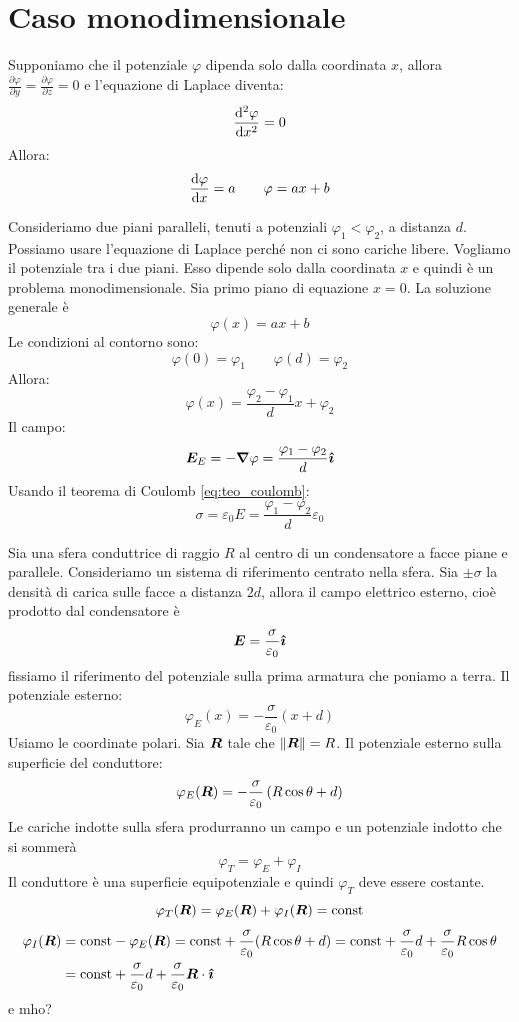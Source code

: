 \section{Caso monodimensionale}
Supponiamo che il potenziale $\varphi$ dipenda solo dalla coordinata $x$, allora $\frac{\partial\varphi}{\partial y}=\frac{\partial\varphi}{\partial z}=0$ e l'equazione di Laplace diventa:
\[\frac{\mathrm{d}^2\varphi}{\mathrm{d} x^2}=0\]
Allora:
\[\frac{\mathrm{d} \varphi}{\mathrm{d} x}=a\qquad \varphi=ax+b\]
\begin{Es}[condensatore]
  Consideriamo due piani paralleli, tenuti a potenziali $\varphi_1<\varphi_2$, a distanza $d$. Possiamo usare l'equazione di Laplace perché non ci sono cariche libere. Vogliamo il potenziale tra i due piani. Esso dipende solo dalla coordinata $x$ e quindi è un problema monodimensionale. Sia primo piano di equazione $x=0$. La soluzione generale è
  \[\varphi(x)=ax+b\]
  Le condizioni al contorno sono:
  \[\varphi(0)=\varphi_1\qquad\varphi(d)=\varphi_2\]
  Allora:
  \[\varphi(x)=\frac{\varphi_2-\varphi_1}{d}x+\varphi_2\]
  Il campo:
  \[\boldsymbol{E}_E=-\boldsymbol{\nabla}\varphi=\frac{\varphi_1-\varphi_2}{d}\boldsymbol{\hat {\imath}}\]
  Usando il teorema di Coulomb \eqref{eq:teo_coulomb}:
  \[\sigma=\varepsilon_0E=\frac{\varphi_1-\varphi_2}{d}\varepsilon_0\]
\end{Es}
\begin{Es}
  Sia una sfera conduttrice di raggio $R$ al centro di un condensatore a facce piane e parallele. Consideriamo un sistema di riferimento centrato nella sfera. Sia $\pm\sigma$ la densità di carica sulle facce a distanza $2d$, allora il campo elettrico esterno, cioè prodotto dal condensatore è
  \[\boldsymbol{E}=\frac{\sigma}{\varepsilon_0}\boldsymbol{\hat {\imath}}\]
  fissiamo il riferimento del potenziale sulla prima armatura che poniamo a terra. Il potenziale esterno:
  \[\varphi_{E}(x)=-\frac{\sigma}{\varepsilon_0}(x+d)\]
  Usiamo le coordinate polari. Sia $\boldsymbol{R}$ tale che $\left\lVert\boldsymbol{R}\right\rVert=R$. Il potenziale esterno sulla superficie del conduttore:
  \[\varphi_E(\boldsymbol{R})=-\frac{\sigma}{\varepsilon_0}\left(R\cos\theta+d\right)\]
  Le cariche indotte sulla sfera produrranno un campo e un potenziale indotto che si sommerà
  \[\varphi_T=\varphi_E+\varphi_I\]
  Il conduttore è una superficie equipotenziale e quindi $\varphi_T$ deve essere costante.
  \[\varphi_T(\boldsymbol{R})=\varphi_E(\boldsymbol{R})+\varphi_I(\boldsymbol{R})=\text{const}\]
  \begin{align*}
    \varphi_I(\boldsymbol{R}) & =\text{const}-\varphi_E(\boldsymbol{R})=\text{const}+\frac{\sigma}{\varepsilon_0}(R\cos\theta+d)=\text{const}+\frac{\sigma}{\varepsilon_0}d+\frac{\sigma}{\varepsilon_0}R\cos\theta \\
                     & =\text{const}+\frac{\sigma}{\varepsilon_0}d+\frac{\sigma}{\varepsilon_0}\boldsymbol{R}\cdot\boldsymbol{\hat {\imath}}
  \end{align*}
  e mho?
\end{Es}

